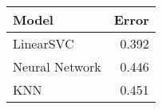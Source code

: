 \begin{tabular}{lr}
\toprule
         Model &  Error \\
\midrule
     LinearSVC &  0.392 \\
Neural Network &  0.446 \\
           KNN &  0.451 \\
\bottomrule
\end{tabular}
